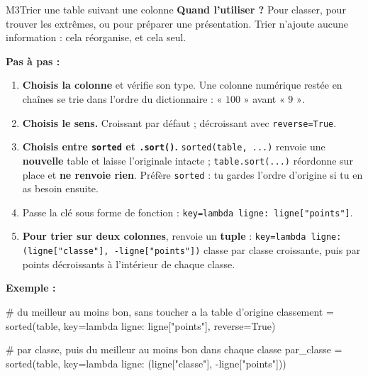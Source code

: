 \begin{fichemethode}{M3}{Trier une table suivant une colonne}
\textbf{Quand l'utiliser ?} Pour classer, pour trouver les extrêmes, ou pour préparer une
présentation. Trier n'ajoute aucune information : cela réorganise, et cela seul.

\textbf{Pas à pas :}
\begin{enumerate}
  \item \textbf{Choisis la colonne} et vérifie son type. Une colonne numérique restée en
    chaînes se trie dans l'ordre du dictionnaire : $\text{« }100\text{ »}$ avant
    $\text{« }9\text{ »}$.
  \item \textbf{Choisis le sens.} Croissant par défaut ; décroissant avec
    \lstinline{reverse=True}.
  \item \textbf{Choisis entre \lstinline{sorted} et \lstinline{.sort()}.}
    \lstinline{sorted(table, ...)} renvoie une \textbf{nouvelle} table et laisse l'originale
    intacte ; \lstinline{table.sort(...)} réordonne sur place et \textbf{ne renvoie rien}.
    Préfère \lstinline{sorted} : tu gardes l'ordre d'origine si tu en as besoin ensuite.
  \item Passe la clé sous forme de fonction : \lstinline{key=lambda ligne: ligne["points"]}.
  \item \textbf{Pour trier sur deux colonnes}, renvoie un \textbf{tuple} :
    \lstinline{key=lambda ligne: (ligne["classe"], -ligne["points"])} classe par classe croissante, puis
    par points décroissants à l'intérieur de chaque classe.
\end{enumerate}

\textbf{Exemple :}
\begin{python}
# du meilleur au moins bon, sans toucher a la table d'origine
classement = sorted(table, key=lambda ligne: ligne["points"], reverse=True)

# par classe, puis du meilleur au moins bon dans chaque classe
par_classe = sorted(table, key=lambda ligne: (ligne["classe"], -ligne["points"]))
\end{python}


\end{fichemethode}
